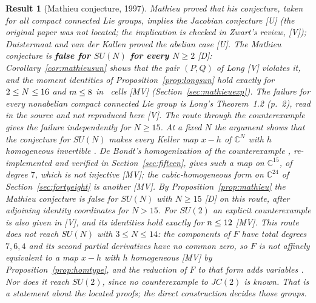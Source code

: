 \documentclass[11pt]{article}
\newtheorem{corollary}{Result}
\theoremstyle{remark}
\newcommand{\C}{\mathbb{C}}
\begin{document}
\begin{corollary}[Mathieu conjecture, 1997]\label{res:mathieu}
Mathieu proved that his conjecture, taken for all compact connected Lie groups, implies the Jacobian conjecture \cite{Mathieu1997} [U] (the original paper was not located; the implication is checked in Zwart's review, \cite[Theorems~4.16 and~4.23, pp.~39 and~43]{Zwart2025} [V]); Duistermaat and van der Kallen proved the abelian case \cite{DvdK1998} [U]. The Mathieu conjecture is \textbf{false for $SU(N)$ for every $N\ge2$} [D]: Corollary~\ref{cor:mathieusun} shows that the pair $(P,Q)$ of Long \cite[Theorems~1.2 and~3.1, pp.~2 and~4; Proposition~5.4, p.~8]{LongMathieu2026} [V] violates it, and the moment identities of Proposition~\ref{prop:longsun} hold exactly for $2\le N\le16$ and $m\le8$ in \nmccells\ cells [MV] (Section~\ref{sec:mathieuexp}). The failure for every nonabelian compact connected Lie group is Long's Theorem~1.2 (p.~2), read in the source and not reproduced here [V]. The route through the counterexample gives the failure independently for $N\ge15$. At a fixed $N$ the argument shows that the conjecture for $SU(N)$ makes every Keller map $x-h$ of $\C^N$ with $h$ homogeneous invertible \cite[Theorems~4.16 and~4.23, pp.~39 and~43]{Zwart2025}. De Bondt's homogenization of the counterexample \cite[Section~2.4.3, p.~14]{deBondt2026}, re-implemented and verified in Section~\ref{sec:fifteen}, gives such a map on $\C^{15}$, of degree $7$, which is not injective [MV]; the cubic-homogeneous form on $\C^{24}$ of Section~\ref{sec:fortyeight} is another [MV]. By Proposition~\ref{prop:mathieu} the Mathieu conjecture is false for $SU(N)$ with $N \ge 15$ [D] on this route, after adjoining identity coordinates for $N > 15$. For $SU(2)$ an explicit counterexample is also given in \cite[Theorem~4.2, p.~6]{LongSU2} [V], and its identities hold exactly for $n\le12$ [MV]. This route does not reach $SU(N)$ with $3 \le N \le 14$: the components of $F$ have total degrees $7, 6, 4$ and its second partial derivatives have no common zero, so $F$ is not affinely equivalent to a map $x - h$ with $h$ homogeneous [MV] by Proposition~\ref{prop:homtype}, and the reduction of $F$ to that form adds variables \cite[Theorem~(2.1), p.~304]{BCW1982}. Nor does it reach $SU(2)$, since no counterexample to $JC(2)$ is known. That is a statement about the located proofs; the direct construction decides those groups.
\end{corollary}
\end{document}
